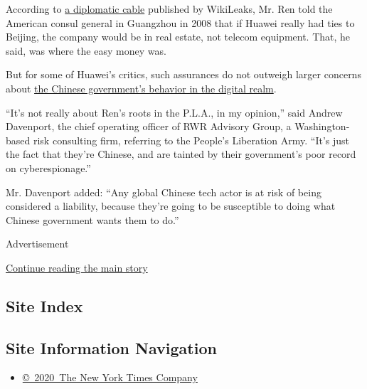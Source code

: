 According to
\href{https://search.wikileaks.org/plusd/cables/08GUANGZHOU171_a.html}{a
diplomatic cable} published by WikiLeaks, Mr. Ren told the American
consul general in Guangzhou in 2008 that if Huawei really had ties to
Beijing, the company would be in real estate, not telecom equipment.
That, he said, was where the easy money was.

But for some of Huawei's critics, such assurances do not outweigh larger
concerns about
\href{https://www.nytimes.com/2018/11/29/us/politics/china-trump-cyberespionage.html}{the
Chinese government's behavior in the digital realm}.

``It's not really about Ren's roots in the P.L.A., in my opinion,'' said
Andrew Davenport, the chief operating officer of RWR Advisory Group, a
Washington-based risk consulting firm, referring to the People's
Liberation Army. ``It's just the fact that they're Chinese, and are
tainted by their government's poor record on cyberespionage.''

Mr. Davenport added: ``Any global Chinese tech actor is at risk of being
considered a liability, because they're going to be susceptible to doing
what Chinese government wants them to do.''

Advertisement

\protect\hyperlink{after-bottom}{Continue reading the main story}

\hypertarget{site-index}{%
\subsection{Site Index}\label{site-index}}

\hypertarget{site-information-navigation}{%
\subsection{Site Information
Navigation}\label{site-information-navigation}}

\begin{itemize}
\tightlist
\item
  \href{https://help.nytimes.com/hc/en-us/articles/115014792127-Copyright-notice}{©~2020~The
  New York Times Company}
\end{itemize}

